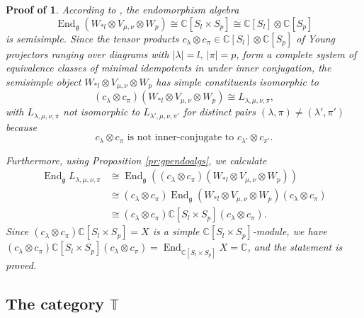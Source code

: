 \documentclass[11pt]{article}
\theoremstyle{plain}
\theoremstyle{nonumberplain}
\theoremstyle{plain}
\numberwithin{equation}{section}
\theoremstyle{nonumberplain}
\newcommand\pf[1]{\newtheorem{#1}{Proof of \Cref{#1}}}
\newcommand\bC{{\mathbb C}}
\newcommand\bT{{\mathbb T}}
\newcommand\fg{{\mathfrak g}}
\newcommand\1{{\bf 1}}
\DeclareMathOperator{\End}{\mathrm{End}}
\begin{document}
\pf{th:scalaralgs}
\begin{th:scalaralgs}
  According to , the endomorphism algebra
  \begin{equation}\label{eq:endss}
    \End_{\fg} (W_{*l}\otimes V_{\mu,\nu}\otimes W_{p})\cong \bC[S_l\times S_p]\cong \bC [S_l ]\otimes \bC [S_p]
  \end{equation}
  is semisimple. Since the tensor products
    $c_{\lambda}\otimes c_{\pi}\in \bC [S_l]\otimes \bC [S_p ]$
  of Young projectors ranging over diagrams with $|\lambda|=l,~|\pi|=p$,  
  form a complete system of equivalence classes of minimal idempotents in  under inner conjugation, the semisimple object $W_{*l}\otimes V_{\mu,\nu}\otimes W_{p}$ has simple constituents isomorphic to
  \begin{equation*}
    (c_\lambda\otimes c_{\pi})\left(W_{*l}\otimes V_{\mu,\nu}\otimes W_{p}\right) \cong L_{\lambda,\mu,\nu,\pi},
  \end{equation*}
  with  $L_{\lambda,\mu,\nu,\pi}$ not isomorphic to $ L_{\lambda',\mu,\nu,\pi'}$ for distinct pairs $(\lambda,\pi)\ne (\lambda',\pi')$ because
  \begin{equation*}
    c_{\lambda}\otimes c_{\pi}\text{ is not inner-conjugate to }c_{\lambda'}\otimes c_{\pi'}.
  \end{equation*}
  
  Furthermore, using Proposition \ref{pr:gpendoalgs}, we calculate 
  \begin{align*}
  \End_{\fg}L_{\lambda,\mu,\nu,\pi}&\cong \End_{\fg}\left((c_\lambda\otimes c_{\pi})\left(W_{*l}\otimes V_{\mu,\nu}\otimes W_{p}\right) \right)\\
  &\cong (c_\lambda\otimes c_{\pi})\End_{\fg}\left(W_{*l}\otimes V_{\mu,\nu}\otimes W_{p}\right)(c_\lambda\otimes c_{\pi})\\
  &\cong (c_\lambda\otimes c_{\pi})\bC[S_l\times S_p](c_\lambda\otimes c_{\pi}).
  \end{align*}
  Since $(c_{\lambda}\otimes c_{\pi})\bC[S_l\times S_p]=X$ is a simple $\bC[S_l\times S_p] $-module, we have $(c_{\lambda}\otimes c_{\pi})\bC[S_l\times S_p](c_{\lambda}\otimes c_{\pi})=\End_{\bC[S_l\times S_p]} X=\bC$, and the statement is proved.
  

\end{th:scalaralgs}


	


\subsection{The category $\bT$}\label{subse:ord-cat}
\end{document}
